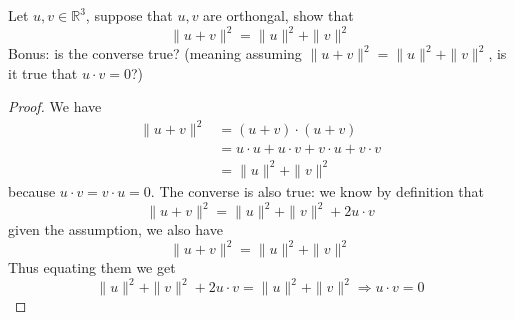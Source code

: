 \documentclass[openany]{book}
\newcommand{\R}{\mathbb{R}}
\begin{document}
        
        
        
        



\begin{prob}
    Let $u,v\in\R^3$, suppose that $u,v$ are orthongal, show that 
    \begin{equation*}
        \|u+v\|^2=\|u\|^2+\|v\|^2
    \end{equation*}
    Bonus: is the converse true? (meaning assuming $ \|u+v\|^2=\|u\|^2+\|v\|^2$, is it true that $u\cdot v=0$?)
\end{prob}
\begin{proof}
    We have 
    \begin{align*}
        \|u+v\|^2&=(u+v)\cdot(u+v)\\
        &=u\cdot u+u\cdot v+v\cdot u+v\cdot v\\
        &=\|u\|^2+\|v\|^2
    \end{align*}
    because $u\cdot v=v\cdot u=0$. The converse is also true: we know by definition that
    \begin{equation*}
        \|u+v\|^2=\|u\|^2+\|v\|^2+2u\cdot v
    \end{equation*}
    given the assumption, we also have 
    \begin{equation*}
        \|u+v\|^2=\|u\|^2+\|v\|^2
    \end{equation*}
    Thus equating them we get 
    \begin{equation*}
        \|u\|^2+\|v\|^2+2u\cdot v=\|u\|^2+\|v\|^2\Rightarrow u\cdot v=0
    \end{equation*}
\end{proof}
\end{document}
